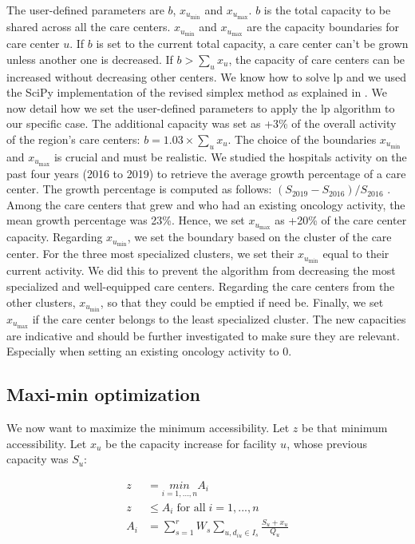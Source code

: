 The user-defined parameters are $b$, $x_{u_\text{min}}$ and $x_{u_\text{max}}$.
$b$ is the total capacity to be shared across all the care centers.
$x_{u_\text{min}}$ and $x_{u_\text{max}}$ are the capacity boundaries for care
center $u$. If $b$ is set to the current total capacity, a care center can’t be
grown unless another one is decreased. If $b > \sum_{u} x_u$, the capacity of
care centers can be increased without decreasing other centers. We know how to
solve \ac{lp} and we used the SciPy \cite{virtanen_scipy_2020} implementation of
the revised simplex method as explained in \cite{bertsimas_introduction_1998}.
We now detail how we set the user-defined parameters to apply the \ac{lp}
algorithm to our specific case. The additional capacity was set as +3\% of the
overall activity of the region's care centers: $b = 1.03 \times \sum_{u} x_u$.
The choice of the boundaries $x_{u_\text{min}}$  and $x_{u_\text{max}}$ is
crucial and must be realistic. We studied the hospitals activity on the past
four years (2016 to 2019) to retrieve the average growth percentage of a care
center. The growth percentage is computed as follows: $(S_\text{2019} -
    S_\text{2016}) / S_\text{2016}$ . Among the care centers that grew and who had
an existing oncology activity, the mean growth percentage was 23\%. Hence, we
set $x_{u_\text{max}}$ as +20\% of the care center capacity. Regarding
$x_{u_\text{min}}$, we set the boundary based on the cluster of the care center.
For the three most specialized clusters, we set their $x_{u_\text{min}}$ equal
to their current activity. We did this to prevent the algorithm from decreasing
the most specialized and well-equipped care centers. Regarding the care centers
from the other clusters, $x_{u_\text{min}}$, so that they could be emptied if
need be. Finally, we set $x_{u_\text{max}}$ if the care center belongs to the
least specialized cluster. The new capacities are indicative and should be
further investigated to make sure they are relevant. Especially when setting an
existing oncology activity to 0.

\subsection{Maxi-min optimization}

We now want to maximize the minimum accessibility. Let $z$ be that minimum
accessibility.  Let $x_u$ be the capacity increase for facility $u$, whose
previous capacity was $S_u$:

\begin{align*}
    z   & = \underset{i=1, ..., n}{min} A_i                                  \\
    z   & \leq A_i \; \text{for all} \; i=1,...,n                            \\
    A_i & = \sum_{s=1}^{r} W_s \sum_{u,d_{iu} \in I_s} \frac{S_u + x_u}{Q_u}
\end{align*}

